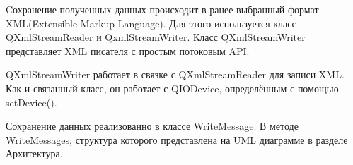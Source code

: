 Cохранение полученных данных происходит в ранее выбранный формат XML(Extensible Markup Language). Для этого используется класс QXmlStreamReader и QxmlStreamWriter.
Класс QXmlStreamWriter представляет XML писателя с простым потоковым API.

QXmlStreamWriter работает в связке с QXmlStreamReader для записи XML. Как и связанный класс, он работает с QIODevice, определённым с помощью setDevice().

Сохранение данных реализованно в классе WriteMessage. В методе WriteMessages, структура которого представлена на UML диаграмме в разделе Архитектура.
